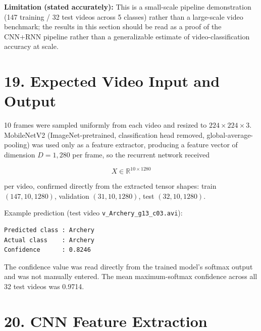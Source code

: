 \documentclass[10pt]{article}
\begin{document}
\textbf{Limitation (stated accurately):} This is a small-scale pipeline
demonstration (147 training / 32 test videos across 5 classes) rather than a
large-scale video benchmark; the results in this section should be read as a
proof of the CNN+RNN pipeline rather than a generalizable estimate of
video-classification accuracy at scale.

\section*{19. Expected Video Input and Output}

10 frames were sampled uniformly from each video and resized to
$224\times224\times3$. MobileNetV2 (ImageNet-pretrained, classification head
removed, global-average-pooling) was used only as a feature extractor,
producing a feature vector of dimension $D=1{,}280$ per frame, so the
recurrent network received

\[
X\in\mathbb{R}^{10\times1280}
\]

per video, confirmed directly from the extracted tensor shapes: train
$(147,10,1280)$, validation $(31,10,1280)$, test $(32,10,1280)$.

Example prediction (test video \texttt{v\_Archery\_g13\_c03.avi}):

\begin{verbatim}
Predicted class : Archery
Actual class    : Archery
Confidence      : 0.8246
\end{verbatim}

The confidence value was read directly from the trained model's softmax
output and was not manually entered. The mean maximum-softmax confidence
across all 32 test videos was 0.9714.

\section*{20. CNN Feature Extraction}

\begin{center}
\end{center}
\end{document}
